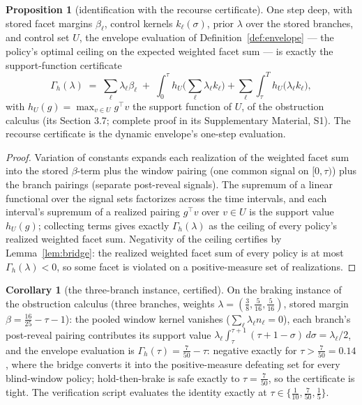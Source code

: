 \documentclass[10pt,twocolumn]{article}
\theoremstyle{definition}
\newtheorem{proposition}{Proposition}
\newtheorem{corollary}{Corollary}
\begin{document}
\begin{proposition}[identification with the recourse certificate]
\label{prop:recourse-id}
One step deep, with stored facet margins $\beta_{\ell}$, control kernels
$k_{\ell}(\sigma)$, prior $\lambda$ over the stored branches, and control
set $U$, the envelope evaluation of
Definition~\ref{def:envelope} --- the policy's optimal ceiling on the
expected weighted facet sum --- is exactly the support-function certificate
\[
\Gamma_{h}(\lambda) \;=\; \sum_{\ell} \lambda_{\ell} \beta_{\ell}
\;+\; \int_{0}^{\tau} h_{U}\Big(\sum_{\ell} \lambda_{\ell} k_{\ell}\Big)
+ \sum_{\ell} \int_{\tau}^{T} h_{U}\big(\lambda_{\ell} k_{\ell}\big),
\]
with $h_{U}(g) = \max_{v \in U} g^{\top} v$ the support function of $U$,
of the obstruction calculus (its Section 3.7; complete proof in its
Supplementary Material, S1). The recourse certificate is the dynamic
envelope's one-step evaluation.
\end{proposition}
\begin{proof}
Variation of constants expands each realization of the weighted facet sum
into the stored $\beta$-term plus the window pairing (one common signal on
$[0, \tau)$) plus the branch pairings (separate post-reveal signals). The
supremum of a linear functional over the signal sets factorizes across the
time intervals, and each interval's supremum of a realized pairing
$g^{\top} v$ over $v \in U$ is the support value $h_{U}(g)$; collecting
terms gives exactly $\Gamma_{h}(\lambda)$ as the ceiling of every policy's
realized weighted facet sum. Negativity of the ceiling certifies by
Lemma~\ref{lem:bridge}: the realized weighted facet sum of every policy is
at most $\Gamma_{h}(\lambda) < 0$, so some facet is violated on a
positive-measure set of realizations.
\end{proof}

\begin{corollary}[the three-branch instance, certified]\label{cor:three-branch}
On the braking instance of the obstruction calculus (three branches,
weights $\lambda = (\tfrac{3}{8}, \tfrac{5}{16}, \tfrac{5}{16})$, stored
margin $\beta = \tfrac{16}{25} - \tau - 1$): the pooled window kernel
vanishes ($\sum_{\ell} \lambda_{\ell} n_{\ell} = 0$), each branch's
post-reveal pairing contributes its support value
$\lambda_{\ell} \int_{\tau}^{\tau+1} (\tau + 1 - \sigma)\, d\sigma =
\lambda_{\ell}/2$, and the envelope evaluation is
$\Gamma_{h}(\tau) = \tfrac{7}{50} - \tau$: negative exactly for
$\tau > \tfrac{7}{50} = 0.14$, where the bridge converts it into the
positive-measure defeating set for every blind-window policy;
hold-then-brake is safe exactly to $\tau = \tfrac{7}{50}$, so the
certificate is tight. The verification script evaluates the identity
exactly at $\tau \in \{\tfrac{1}{10}, \tfrac{7}{50}, \tfrac{1}{5}\}$.
\end{corollary}
\end{document}
